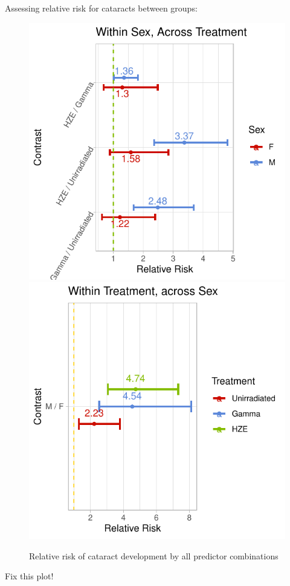 \documentclass[12pt]{article}
\begin{document}
Assessing relative risk for cataracts between groups:\\

\begin{figure}[H]
\includegraphics[width=0.5\linewidth]{bookdown_report_files/figure-latex/RR-1} \includegraphics[width=0.5\linewidth]{bookdown_report_files/figure-latex/RR-2} \caption{Relative risk of cataract development by all predictor combinations}\label{fig:RR}
\end{figure}

Fix this plot!
\end{document}
